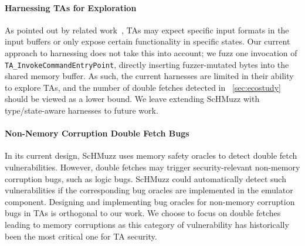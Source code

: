 \documentclass[conference]{IEEEtran} %
\newcommand{\sysname}{ScHMuzz\xspace}
\newcommand{\stagetwo}{Fetch-Anchored Fuzzing\xspace} %
\newcommand{\numvulns}{six\xspace}
\providecommand{\DIFaddbegin}{} %
\providecommand{\DIFaddend}{} %
\providecommand{\DIFdelbegin}{} %
\providecommand{\DIFdelend}{} %
\begin{document}
\paragraph{Harnessing TAs for Exploration}
As pointed out by related work~\cite{teezz,syncemu}, TAs may 
expect specific input formats in the input buffers or only expose certain functionality 
in specific states. Our current approach to harnessing does not take this into account; we fuzz 
one invocation of \texttt{TA\_InvokeCommandEntryPoint}, directly inserting fuzzer-mutated bytes 
into the shared memory buffer. As such, the current harnesses are limited in their ability to 
explore TAs, and the number of double fetches detected in~\DIFdelbegin %
\DIFdelend \DIFaddbegin \autoref{sec:ecostudy} \DIFaddend should 
be viewed as a lower bound. We leave extending \sysname with type/state-aware harnesses to 
future work. 

\paragraph{Non-Nemory Corruption Double Fetch Bugs}
In its current design, \sysname uses memory safety oracles to detect double fetch vulnerabilities. 
However, double fetches may trigger security-relevant non-memory corruption 
bugs, such as logic bugs. \sysname could automatically detect such vulnerabilities if 
the corresponding bug oracles are implemented in the emulator component. Designing and implementing 
bug oracles for non-memory corruption bugs in TAs is orthogonal to our work. We choose to 
focus on double fetches leading to memory corruptions as this category of vulnerability has 
historically been the most critical one for TA security.

\end{document}
